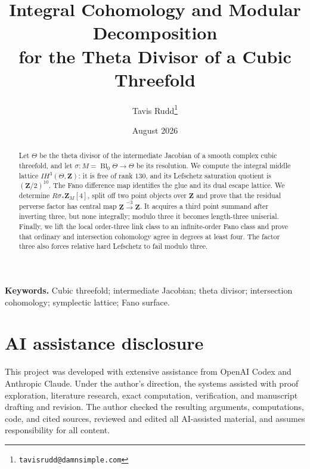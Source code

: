 \documentclass[11pt]{article}
\title{Integral Cohomology and Modular Decomposition\\
  for the Theta Divisor of a Cubic Threefold}
\author{Tavis Rudd\thanks{\texttt{tavisrudd@damnsimple.com}}}
\date{August 2026}
\theoremstyle{definition}
\theoremstyle{remark}
\newcommand{\Z}{\mathbf Z}
\begin{document}
\maketitle

\begin{abstract}
Let \(\Theta\) be the theta divisor of the intermediate Jacobian of a
smooth complex cubic threefold, and let
\(\sigma:M=\operatorname{Bl}_0\Theta\to\Theta\) be its resolution.  We
compute the integral middle lattice \(IH^3(\Theta,\Z)\): it is free of rank
\(130\), and its Lefschetz saturation quotient is \((\Z/2)^{10}\).  The
Fano difference map identifies the glue and its dual escape lattice.  We
determine \(R\sigma_*\Z_M[4]\), split off two
point objects over \(\Z\) and prove that the residual perverse factor has
central map \(\Z\xrightarrow{-3}\Z\).  It acquires a third point summand
after inverting three, but none integrally; modulo three it becomes
length-three uniserial.  Finally, we lift the local order-three
link class to an infinite-order Fano class and prove that ordinary and
intersection cohomology agree in degrees at least four.  The factor three
also forces relative hard Lefschetz to fail modulo three.
\end{abstract}

\noindent\textbf{Keywords.} Cubic threefold; intermediate Jacobian; theta
divisor; intersection cohomology; symplectic lattice; Fano surface.









\section*{AI assistance disclosure}

This project was developed with extensive assistance from OpenAI Codex and
Anthropic Claude. Under the author's direction, the systems assisted with
proof exploration, literature research, exact computation, verification,
and manuscript drafting and revision. The author checked the resulting
arguments, computations, code, and cited sources, reviewed and edited all
AI-assisted material, and assumes responsibility for all content.

\begingroup
\small


\endgroup
\end{document}
